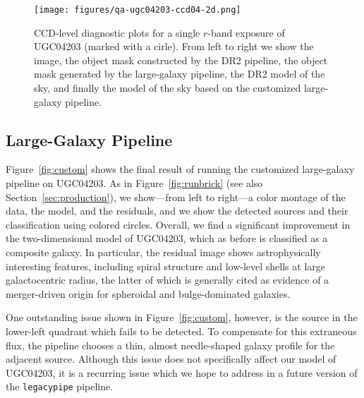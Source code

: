 

\begin{figure}[!ht]
\centering
\texttt{[image: figures/qa-ugc04203-ccd04-2d.png]}
\caption{CCD-level diagnostic plots for a single $r$-band exposure of UGC04203
  (marked with a cirle).  From left to right we show the image, the object mask
  constructed by the DR2 pipeline, the object mask generated by the large-galaxy
  pipeline, the DR2 model of the sky, and finally the model of the sky based on
  the customized large-galaxy pipeline. \label{fig:qaccd}}
\end{figure}

\subsection{Large-Galaxy Pipeline}\label{sec:largepipeline}

Figure~\ref{fig:custom} shows the final result of running the customized
large-galaxy pipeline on UGC04203.  As in Figure~\ref{fig:runbrick} (see also
Section~\ref{sec:production}), we show---from left to right---a color montage of
the data, the model, and the residuals, and we show the detected sources and
their classification using colored circles.  Overall, we find a significant
improvement in the two-dimensional model of UGC04203, which as before is
classified as a composite galaxy.  In particular, the residual image shows
astrophysically interesting features, including spiral structure and low-level
shells at large galactocentric radius, the latter of which is generally cited as
evidence of a merger-driven origin for spheroidal and bulge-dominated galaxies. 

One outstanding issue shown in Figure~\ref{fig:custom}, however, is the source
in the lower-left quadrant which fails to be detected.  To compensate for this
extraneous flux, the pipeline chooses a thin, almost needle-shaped galaxy
profile for the adjacent source.  Although this issue does not specifically
affect our model of UGC04203, it is a recurring issue which we hope to address
in a future version of the {\tt legacypipe} pipeline.

